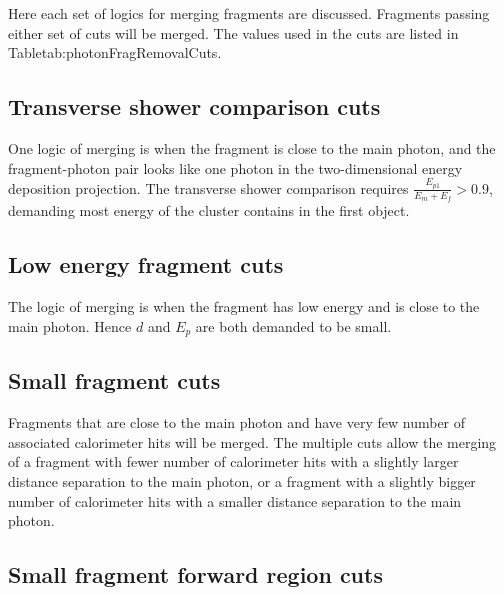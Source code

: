 Here each set of logics for merging fragments are discussed. Fragments passing either set of cuts will be merged. The values used in the cuts are listed in Table{tab:photonFragRemovalCuts}.

\subsection{Transverse shower comparison cuts}

One logic of merging is when the fragment is close to the main photon, and the fragment-photon pair looks like one photon in the two-dimensional energy deposition projection. The transverse shower comparison requires $\frac{E_{p1}}{E_m + E_f} > 0.9 $, demanding  most energy of the cluster contains in the first \ShowerPeak object.




\subsection{Low energy fragment cuts}

The logic of merging  is when the fragment has low energy and is close to the main photon.  Hence $d$ and $E_p$ are both demanded to be small.

\subsection{Small fragment cuts}

Fragments that are close to the main photon and have very few number of associated calorimeter hits will be merged. The multiple cuts allow the merging of a fragment with fewer number of  calorimeter hits with a slightly larger distance separation to the main photon, or a fragment with a slightly bigger number of  calorimeter hits with a smaller distance separation to the main photon.

\subsection{Small fragment forward region cuts}

